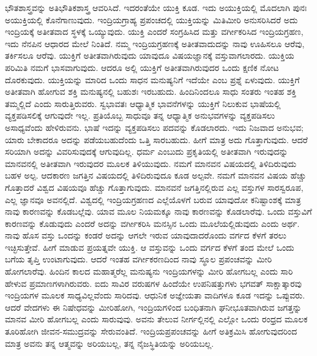 ಭೌತಶಾಸ್ತ್ರವನ್ನು ಅತಿಭೌತಿಕಶಾಸ್ತ್ರ ಆವರಿಸಿದೆ. ಇದರಂತೆಯೇ ಯುಕ್ತಿ ಕೂಡ. ಇದು ಅಯುಕ್ತಿಯಲ್ಲಿ ಮೊದಲಾಗಿ ಪುನಃ ಅಯುಕ್ತಿಯಲ್ಲಿ ಕೊನೆಗಾಣುವುದು. ಇಂದ್ರಿಯಗ್ರಾಹ್ಯ ಪ್ರಪಂಚದಲ್ಲಿ ಯುಕ್ತಿಯನ್ನು ಮಿತಿಮೀರಿ ಅನುಸರಿಸಿದರೆ ಅದು ಇಂದ್ರಿಯಕ್ಕೆ ಅತೀತವಾದ ಸ್ಥಳಕ್ಕೆ ಒಯ್ಯುವುದು. ಯುಕ್ತಿ ಎಂದರೆ ಸಂಗ್ರಹಿಸಿದ ಮತ್ತು ವರ್ಗೀಕರಿಸಿದ ಇಂದ್ರಿಯಗ್ರಹಣ, ಇದು ನೆನಪಿನ ಆಧಾರದ ಮೇಲೆ ನಿಂತಿದೆ. ನಮ್ಮ ಇಂದ್ರಿಯಗ್ರಹಣಕ್ಕೆ ಅತೀತವಾದುದನ್ನು ನಾವು ಊಹಿಸಲೂ ಆರೆವು, ತರ್ಕಿಸಲೂ ಆರೆವು. ಯುಕ್ತಿಗೆ ಅತೀತವಾಗಿರುವುದು ಯಾವುದೂ ವಿಷಯಜ್ಞಾನಕ್ಕೆ ವಸ್ತುವಾಗಲಾರದು. ಯುಕ್ತಿಯ ಪರಿಮಿತಿ ನಮಗೆ ಭಾಸವಾಗುವುದು. ಆದರೂ ಅಲ್ಲಿ ಯುಕ್ತಿಗೆ ಅತೀತವಾಗಿರುವುದರ ಒಂದು ಕ್ಷಣಿಕ ನೋಟ ದೊರಕುವುದು. ಯುಕ್ತಿಯನ್ನು ಮಾರಿದ ಒಂದು ಸಾಧನ ಮನುಷ್ಯನಿಗೆ ಇದೆಯೇ ಎಂಬ ಪ್ರಶ್ನೆ ಏಳುವುದು. ಯುಕ್ತಿಗೆ ಅತೀತವಾಗಿ ಹೋಗುವ ಶಕ್ತಿ ಮನುಷ್ಯನಲ್ಲಿ ಬಹುಶಃ ಇರಬಹುದು. ಹಿಂದಿನಿಂದಲೂ ಸಾಧು ಸಂತರು ಇಂತಹ ಶಕ್ತಿ ತಮ್ಮಲ್ಲಿದೆ ಎಂದು ಸಾರುತ್ತಿರುವರು. ಸ್ವಭಾವತಃ ಆಧ್ಯಾತ್ಮಿಕ ಭಾವನೆಗಳನ್ನು ಯುಕ್ತಿಗೆ ನಿಲುಕುವ ಭಾಷೆಯಲ್ಲಿ ವ್ಯಕ್ತಪಡಿಸಲಿಕ್ಕೆ ಆಗುವುದೇ ಇಲ್ಲ. ಪ್ರತಿಯೊಬ್ಬ ಸಾಧುವೂ ತನ್ನ ಆಧ್ಯಾತ್ಮಿಕ ಅನುಭವಗಳನ್ನು ವ್ಯಕ್ತಪಡಿಸಲು ಅಸಾಧ್ಯವೆಂದು ಹೇಳಿರುವನು. ಭಾಷೆ ಇದನ್ನು ವ್ಯಕ್ತಪಡಿಸಲು ಪದವನ್ನು ಕೊಡಲಾರದು. ಇದು ನಿಜವಾದ ಅನುಭವ; ಯಾರು ಬೇಕಾದರೂ ಅದನ್ನು ಪಡೆಯಬಹುದೆಂದು ಒತ್ತಿ ಸಾರಬಹುದು. ಹೀಗೆ ಮಾತ್ರ ಅದು ಗೊತ್ತಾಗುವುದು. ಆದರೆ ಸರಿಯಾಗಿ ಅದನ್ನು ವಿವರಿಸುವುದಕ್ಕೆ ಆಗುವುದಿಲ್ಲ. ಧರ್ಮ ಎಂಬುದು ಪ್ರಕೃತಿಯಲ್ಲಿ ಅತೀತವಾಗಿ ಇರುವುದನ್ನು ಮಾನವನಲ್ಲಿ ಅತೀತವಾಗಿ ಇರುವುದರ ಮೂಲಕ ತಿಳಿಯುವುದು. ನಮಗೆ ಮಾನವನ ವಿಷಯದಲ್ಲಿ ತಿಳಿದಿರುವುದು ಬಹಳ ಅಲ್ಪ. ಆದಕಾರಣ ಜಗತ್ತಿನ ವಿಷಯದಲ್ಲಿ ತಿಳಿದಿರುವುದೂ ಕೂಡ ಅಲ್ಪವೇ. ನಮಗೆ ಮಾನವನ ವಿಷಯ ಹೆಚ್ಚು ಗೊತ್ತಾದರೆ ವಿಶ್ವದ ವಿಷಯವೂ ಹೆಚ್ಚು ಗೊತ್ತಾಗುವುದು. ಮಾನವನೆ ಜಗತ್ತಿನಲ್ಲಿರುವ ಎಲ್ಲ ವಸ್ತುಗಳ ಸಾರಸ್ವರೂಪ, ಎಲ್ಲ ಜ್ಞಾನವೂ ಅವನಲ್ಲಿದೆ. ವಿಶ್ವದಲ್ಲಿ ಇಂದ್ರಿಯಗ್ರಹಣದ ಎಲ್ಲೆಯೊಳಗೆ ಬರುವ ಯಾವುದೋ ಕನಿಷ್ಟಾಂಶಕ್ಕೆ ಮಾತ್ರ ನಾವು ಕಾರಣವನ್ನು ಕೊಡಬಲ್ಲೆವು. ಯಾವ ಮೂಲ ನಿಯಮಕ್ಕೂ ನಾವು ಕಾರಣವನ್ನು ಕೊಡಲಾರೆವು. ಒಂದು ವಸ್ತುವಿಗೆ ಕಾರಣವನ್ನು ಕೊಡುವುದು ಎಂದರೆ ಅದನ್ನು ವರ್ಗೀಕರಿಸಿ ಮನಸ್ಸಿನ ಒಂದು ಮೂಲೆಯಲ್ಲಿಡುವುದು ಎಂದು ಅರ್ಥ. ನಾವು ಹೊಸ ವಸ್ತು ಒಂದನ್ನು ಕಂಡರೆ ಅದನ್ನು ಆಗಲೇ ಇರುವ ಯಾವುದಾದರೊಂದು ವರ್ಗದ ಕೆಳಗೆ ತರಲು ಇಚ್ಛಿಸುತ್ತೇವೆ. ಹೀಗೆ ಮಾಡುವ ಪ್ರಯತ್ನವೇ ಯುಕ್ತಿ. ಆ ವಸ್ತುವನ್ನು ಒಂದು ವರ್ಗದ ಕೆಳಗೆ ತಂದ ಮೇಲೆ ಒಂದು ಬಗೆಯ ತೃಪ್ತಿ ಉಂಟಾಗುವುದು. ಆದರೆ ಇಂತಹ ವರ್ಗೀಕರಣದಿಂದ ನಾವು ಸ್ಥೂಲ ಪ್ರಪಂಚವನ್ನು ಮೀರಿ ಹೋಗಲಾರೆವು. ಹಿಂದಿನ ಕಾಲದ ಮಹಾತ್ಮರೆಲ್ಲ ಮನುಷ್ಯನು ಇಂದ್ರಿಯಗಳನ್ನು ಮೀರಿ ಹೋಗಬಲ್ಲ ಎಂದು ಸಾರಿ ಹೇಳುವ ಪ್ರಮಾಣಗಳಾಗಿರುವರು. ಐದು ಸಾವಿರ ವರುಷಗಳ ಹಿಂದೆಯೇ ಉಪನಿಷತ್ತುಗಳು ಭಗವತ್ ಸಾಕ್ಷಾತ್ಕಾರವು ಇಂದ್ರಿಯಗಳ ಮೂಲಕ ಸಾಧ್ಯವಿಲ್ಲವೆಂದು ಸಾರಿದವು. ಆಧುನಿಕ ಅಜ್ಞೇಯತಾ ವಾದಿಗಳೂ ಕೂಡ ಇದನ್ನು ಒಪ್ಪುವರು. ಆದರೆ ವೇದಗಳು ಈ ನಿಷೇಧವನ್ನು ಮೀರಿಹೋಗಿ, ಇಂದ್ರಿಯಗಳಿಂದ ಬಂಧಿತನಾಗಿ ಘನೀಭೂತವಾಗಿರುವ ಜಗತ್ತನ್ನು ಮಾನವ ಮೀರಿ ಹೋಗಬಲ್ಲ ಎಂದು ಸಾರುವುವು. ಅವನು ತೇಲುವ ನೀರ್ಗಲ್ಲಿನಲ್ಲಿ ಎಲ್ಲೋ ಒಂದು ರಂಧ್ರದ ಮೂಲಕ ತೂರಿಹೋಗಿ ಜೀವನ-ಸಮುದ್ರವನ್ನು ಸೇರುವಂತಿದೆ. ಇಂದ್ರಿಯಪ್ರಪಂಚವನ್ನು ಹೀಗೆ ಅತಿಕ್ರಮಿಸಿ ಹೋಗುವುದರಿಂದ ಮಾತ್ರ ಅವನು ತನ್ನ ಆತ್ಮವನ್ನು ಅರಿಯಬಲ್ಲ, ತನ್ನ ನೈಜಸ್ಥಿತಿಯನ್ನು ಅರಿಯಬಲ್ಲ.

